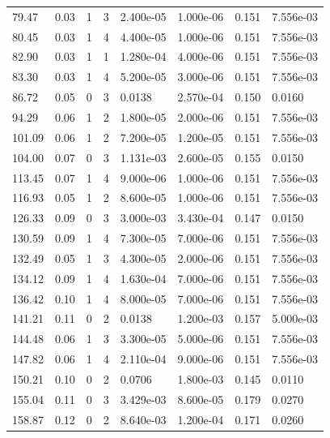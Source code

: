 \documentclass[preview]{standalone}
\begin{document}
{{\begin{tabular}{L{1.2cm}C{1.2cm} C{0.3cm}C{0.5cm} C{1.4cm}C{1.4cm} C{1.4cm}C{1.4cm}}
  79.47  &  0.03  & 1     &  3 &  2.400e-05  & 1.000e-06  & 0.151 &  7.556e-03   \\ 
  80.45  &  0.03  & 1     &  4 &  4.400e-05  & 1.000e-06  & 0.151 &  7.556e-03   \\ 
  82.90  &  0.03  & 1     &  1 &  1.280e-04  & 4.000e-06  & 0.151 &  7.556e-03   \\ 
  83.30  &  0.03  & 1     &  4 &  5.200e-05  & 3.000e-06  & 0.151 &  7.556e-03   \\ 
  86.72  &  0.05  & 0     &  3 &  0.0138  & 2.570e-04  & 0.150 &  0.0160   \\ 
  94.29  &  0.06  & 1     &  2 &  1.800e-05  & 2.000e-06  & 0.151 &  7.556e-03   \\ 
  101.09  &  0.06  & 1     &  2 &  7.200e-05  & 1.200e-05  & 0.151 &  7.556e-03   \\ 
  104.00  &  0.07  & 0     &  3 &  1.131e-03  & 2.600e-05  & 0.155 &  0.0150   \\ 
  113.45  &  0.07  & 1     &  4 &  9.000e-06  & 1.000e-06  & 0.151 &  7.556e-03   \\ 
  116.93  &  0.05  & 1     &  2 &  8.600e-05  & 1.000e-06  & 0.151 &  7.556e-03   \\ 
  126.33  &  0.09  & 0     &  3 &  3.000e-03  & 3.430e-04  & 0.147 &  0.0150   \\ 
  130.59  &  0.09  & 1     &  4 &  7.300e-05  & 7.000e-06  & 0.151 &  7.556e-03   \\ 
  132.49  &  0.05  & 1     &  3 &  4.300e-05  & 2.000e-06  & 0.151 &  7.556e-03   \\ 
  134.12  &  0.09  & 1     &  4 &  1.630e-04  & 7.000e-06  & 0.151 &  7.556e-03   \\ 
  136.42  &  0.10  & 1     &  4 &  8.000e-05  & 7.000e-06  & 0.151 &  7.556e-03   \\ 
  141.21  &  0.11  & 0     &  2 &  0.0138  & 1.200e-03  & 0.157 &  5.000e-03   \\ 
  144.48  &  0.06  & 1     &  3 &  3.300e-05  & 5.000e-06  & 0.151 &  7.556e-03   \\ 
  147.82  &  0.06  & 1     &  4 &  2.110e-04  & 9.000e-06  & 0.151 &  7.556e-03   \\ 
  150.21  &  0.10  & 0     &  2 &  0.0706  & 1.800e-03  & 0.145 &  0.0110   \\ 
  155.04  &  0.11  & 0     &  3 &  3.429e-03  & 8.600e-05  & 0.179 &  0.0270   \\ 
  158.87  &  0.12  & 0     &  2 &  8.640e-03  & 1.200e-04  & 0.171 &  0.0260   \\ 

\end{tabular}}}
\end{document}
